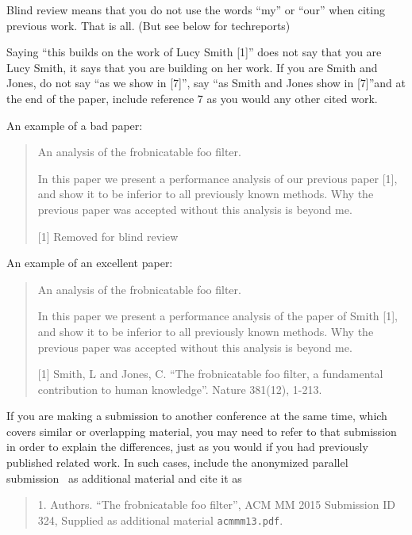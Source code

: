 \documentclass{article}
\begin{document}
Blind review means that you do not use the words ``my'' or ``our'' when citing previous work. That is all. (But see below for techreports)

Saying ``this builds on the work of Lucy Smith [1]'' does not say that you are Lucy Smith, it says that you are building on her work. If you are Smith and Jones, do not say ``as we show in [7]'', say ``as Smith and Jones show in [7]''and at the end of the paper, include reference 7 as you would any other cited work.

An example of a bad paper:
\begin{quote}
\begin{center}
    An analysis of the frobnicatable foo filter.
\end{center}

   In this paper we present a performance analysis of our
   previous paper [1], and show it to be inferior to all
   previously known methods. Why the previous paper was
   accepted without this analysis is beyond me.

   [1] Removed for blind review
\end{quote}

An example of an excellent paper:

\begin{quote}
\begin{center}
     An analysis of the frobnicatable foo filter.
\end{center}

   In this paper we present a performance analysis of the
   paper of Smith [1], and show it to be inferior to
   all previously known methods.  Why the previous paper
   was accepted without this analysis is beyond me.

   [1] Smith, L and Jones, C. ``The frobnicatable foo
   filter, a fundamental contribution to human knowledge''.
   Nature 381(12), 1-213.
\end{quote}

If you are making a submission to another conference at the same time, which covers similar or overlapping material, you may need to refer to that submission in order to explain the differences, just as you would if you had previously published related work. In such cases, include the anonymized parallel submission~\cite{Authors12} as additional material and cite it as

\begin{quote}
1. Authors. ``The frobnicatable foo filter'', ACM MM 2015 Submission ID 324, Supplied as additional material {\tt acmmm13.pdf}.
\end{quote}
\end{document}
